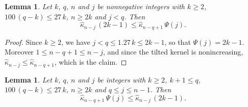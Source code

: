 \documentclass{amsart}
\newtheorem{lemma}[theorem]{Lemma}
\theoremstyle{definition}
\theoremstyle{remark}
\numberwithin{equation}{section}
\begin{document}
\begin{lemma}\label{lem:orderbefore}
Let $k$, $q$, $n$ and $j$ be nonnegative integers with $k\ge 2$, $100\,(q-k)\le 27\,k$, $n\ge 2k$ and $j<q$. Then
\[
\hat\kappa_{n-j}\,(2k-1)\le\hat\kappa_{n-q+1}\,\Psi(j).
\]
\end{lemma}

\begin{proof}
Since $k\ge 2$, we have $j<q\le 1.27\,k\le 2k-1$, so that $\Psi(j)=2k-1$. Moreover $1\le n-q+1\le n-j$, and since the tilted kernel is nonincreasing, $\hat\kappa_{n-j}\le\hat\kappa_{n-q+1}$, which is the claim.
\end{proof}

\begin{lemma}\label{lem:orderafter}
Let $k$, $q$, $n$ and $j$ be integers with $k\ge 2$, $k+1\le q$, $100\,(q-k)\le 27\,k$, $n\ge 2k$ and $q\le j\le n-1$. Then
\[
\hat\kappa_{n-q+1}\,\Psi(j)\le\hat\kappa_{n-j}\,(2k-1).
\]
\end{lemma}
\end{document}
